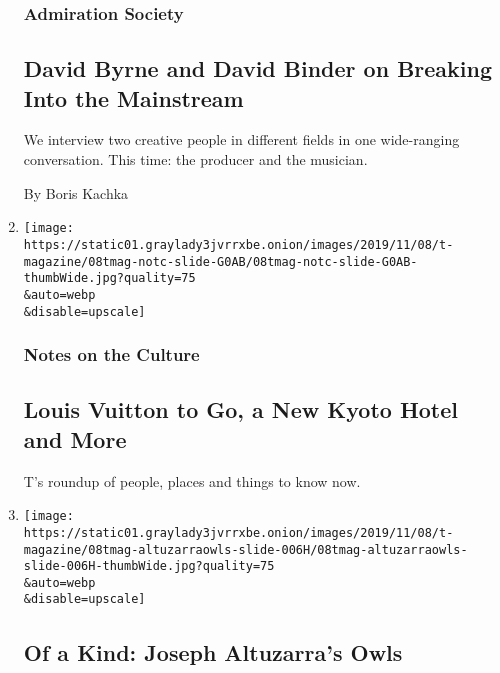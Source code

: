 \begin{enumerate}
  \hypertarget{admiration-society}{%
  \subsubsection{Admiration Society}\label{admiration-society}}

  \hypertarget{david-byrne-and-david-binder-on-breaking-into-the-mainstream}{%
  \subsection{David Byrne and David Binder on Breaking Into the
  Mainstream}\label{david-byrne-and-david-binder-on-breaking-into-the-mainstream}}

  We interview two creative people in different fields in one
  wide-ranging conversation. This time: the producer and the musician.

  By Boris Kachka
\item
  \href{/2019/11/08/t-magazine/louis-vuitton-2054-aman-kyoto-news.html}{}

  \texttt{[image: https://static01.graylady3jvrrxbe.onion/images/2019/11/08/t-magazine/08tmag-notc-slide-G0AB/08tmag-notc-slide-G0AB-thumbWide.jpg?quality=75\\\&auto=webp\\\&disable=upscale]}

  \hypertarget{notes-on-the-culture-1}{%
  \subsubsection{Notes on the Culture}\label{notes-on-the-culture-1}}

  \hypertarget{louis-vuitton-to-go-a-new-kyoto-hotel-and-more}{%
  \subsection{Louis Vuitton to Go, a New Kyoto Hotel and
  More}\label{louis-vuitton-to-go-a-new-kyoto-hotel-and-more}}

  T's roundup of people, places and things to know now.
\item
  \href{/slideshow/2019/11/08/t-magazine/of-a-kind-joseph-altuzarras-owls.html}{}

  \texttt{[image: https://static01.graylady3jvrrxbe.onion/images/2019/11/08/t-magazine/08tmag-altuzarraowls-slide-006H/08tmag-altuzarraowls-slide-006H-thumbWide.jpg?quality=75\\\&auto=webp\\\&disable=upscale]}

  \hypertarget{of-a-kind-joseph-altuzarras-owls}{%
  \subsection{Of a Kind: Joseph Altuzarra's
  Owls}\label{of-a-kind-joseph-altuzarras-owls}}


\end{enumerate}
